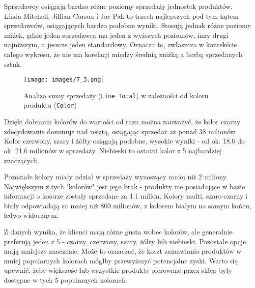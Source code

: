 \documentclass[a4paper,12pt]{article}
\begin{document}
Sprzedawcy osiągają bardzo różne poziomy sprzedaży jednostek produktów. Linda Mitchell, Jillian Carson i Jae Pak to trzech najlepszych pod tym kątem sprzedawców, osiągających bardzo podobne wyniki. Stosują jednak różne poziomy zniżek, gdzie jeden sprzedawca ma jeden z wyższych poziomów, inny drugi najniższym, a jeszcze jeden standardowy. Oznacza to, zwłaszcza w kontekście całego wykresu, że nie ma korelacji między średnią zniżką a liczbą sprzedanych sztuk.

\begin{figure}[H]
    \centering
    \texttt{[image: images/7\_3.png]}
    \caption{Analiza sumy sprzedaży (\texttt{Line Total}) w zależności od koloru produktu (\texttt{Color})}
\end{figure}

Dzięki dobraniu kolorów do wartości od razu można zauważyć, że kolor czarny zdecydowanie dominuje nad resztą, osiągając sprzedaż aż ponad 38 milionów. Kolor czerwony, szary i żółty osiągają podobne, wysokie wyniki - od ok. 18.6 do ok. 21.6 milionów w sprzedaży. Niebieski to ostatni kolor z 5 najbardziej znaczących.

Pozostałe kolory miały udział w sprzedaży wynoszący mniej niż 2 miliony. Największym z tych "kolorów" jest jego brak - produkty nie posiadające w bazie informacji o kolorze zostały sprzedane za 1.1 milion. Kolory multi, szaro-czarny i biały odpowiadają za mniej niż 800 milionów, z kolorem białym na samym końcu, ledwo widocznym.

Z danych wynika, że klienci mają różne gusta wobec kolorów, ale generalnie preferują jeden z 5 - czarny, czerwony, szary, żółty lub niebieski. Pozostałe opcje mają mniejsze znaczenie. Może to oznaczać, że koszt zamawiania produktów w mniej popularnych kolorach mógłby przewyższyć potencjalne zyski. Warto się upewnić, żeby większość lub wszystkie produkty oferowane przez sklep były dostępne w tych 5 popularnych kolorach.

\printbibliography
\end{document}
